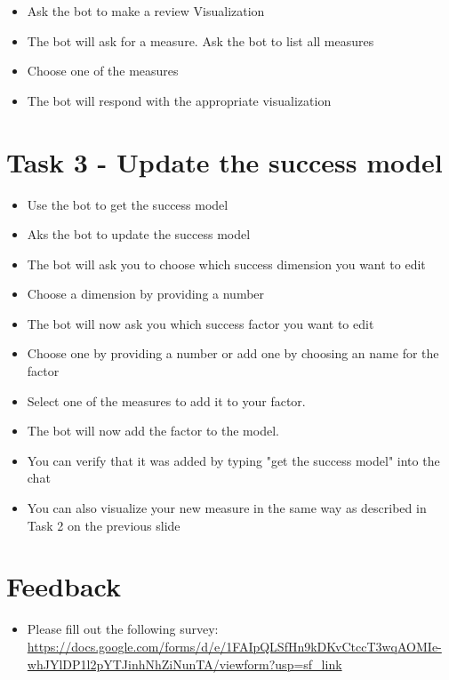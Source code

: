 \begin{itemize}
    \item Ask the bot to make a review Visualization
    \item The bot will ask for a measure. Ask the bot to list all measures
    \item Choose one of the measures 
    \item The bot will respond with the appropriate visualization
\end{itemize}


\section*{Task 3 - Update the success model}
\begin{itemize}
    \item Use the bot to get the success model
    \item Aks the bot to update the success model
    \item The bot will ask you to choose which success dimension you want to edit
    \item Choose a dimension by providing a number
    \item The bot will now ask you which success factor you want to edit
    \item Choose one by providing a number or add one by choosing an name for the factor
    \item Select one of the measures to add it to your factor. 
    \item The bot will now add the factor to the model.
    \item You can verify that it was added by typing "get the success model" into the chat
    \item You can also visualize your new measure in the same way as described in Task 2 on the previous slide
\end{itemize}

\section*{Feedback}
  
\begin{itemize}
  \item Please fill out the following survey: \url{https://docs.google.com/forms/d/e/1FAIpQLSfHn9kDKvCtccT3wqAOMIe-whJYlDP1l2pYTJinhNhZiNunTA/viewform?usp=sf_link}
\end{itemize}

